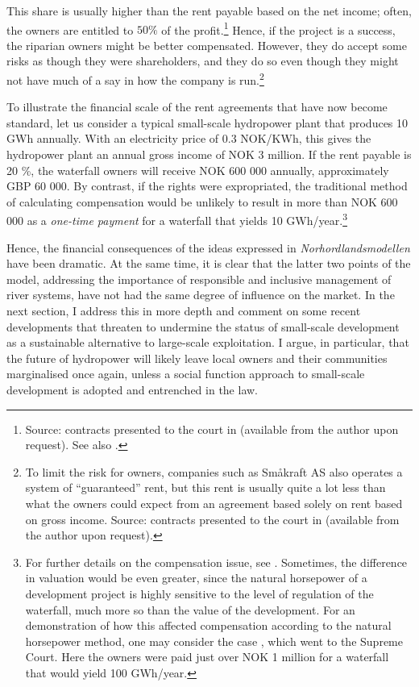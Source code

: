 This share is usually higher than the rent payable based on the net income; often, the owners are entitled to $50 \%$ of the profit.\footnote{Source: contracts presented to the court in \cite{sauda09} (available from the author upon request). See also \cite[58]{hauge15}.} Hence, if the project is a success, the riparian owners might be better compensated. However, they do accept some risks as though they were shareholders, and they do so even though they might not have much of a say in how the company is run.\footnote{To limit the risk for owners, companies such as Småkraft AS also operates a system of ``guaranteed'' rent, but this rent is usually quite a lot less than what the owners could expect from an agreement based solely on rent based on gross income. Source: contracts presented to the court in \cite{sauda09} (available from the author upon request).}

To illustrate the financial scale of the rent agreements that have now become standard, let us consider a typical small-scale hydropower plant that produces 10 GWh annually. With an electricity price of 0.3 NOK/KWh, this gives the hydropower plant an annual gross income of NOK 3 million. If the rent payable is 20 \%, the waterfall owners will receive NOK 600 000 annually, approximately GBP 60 000. By contrast, if the rights were expropriated, the traditional method of calculating compensation would be unlikely to result in more than NOK 600 000 as a {\it one-time payment} for a waterfall that yields 10 GWh/year.\footnote{For further details on the compensation issue, see \cite{dyrkolbotn14,dyrkolbotn15,dyrkolbotn15a}. Sometimes, the difference in valuation would be even greater, since the natural horsepower of a development project is highly sensitive to the level of regulation of the waterfall, much more so than the value of the development. For an demonstration of how this affected compensation according to the natural horsepower method, one may consider the case \cite{hellandsfoss97}, which went to the Supreme Court. Here the owners were paid just over NOK 1 million for a waterfall that would yield 100 GWh/year.}

Hence, the financial consequences of the ideas expressed in {\it Norhordlandsmodellen} have been dramatic. At the same time, it is clear that the latter two points of the model, addressing the importance of responsible and inclusive management of river systems, have not had the same degree of influence on the market. In the next section, I address this in more depth and comment on some recent developments that threaten to undermine the status of small-scale development as a sustainable alternative to large-scale exploitation. I argue, in particular, that the future of hydropower will likely leave local owners and their communities marginalised once again, unless a social function approach to small-scale development is adopted and entrenched in the law.

